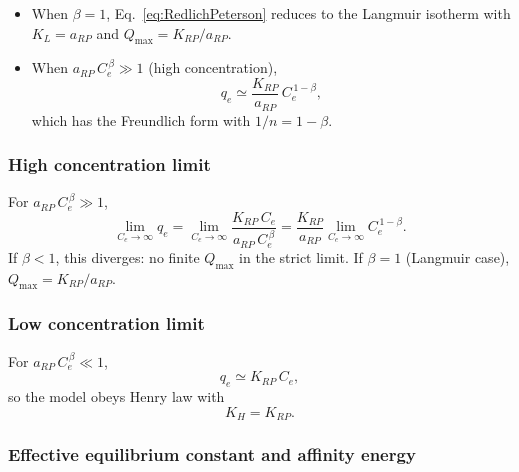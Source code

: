 \documentclass[12pt]{article}
\begin{document}
	\begin{itemize}
		\item When $\beta = 1$, Eq.~\eqref{eq:RedlichPeterson} reduces to
		the Langmuir isotherm with $K_L = a_{RP}$ and
		$Q_{\max} = K_{RP}/a_{RP}$.

		\item When $a_{RP}\,C_e^{\,\beta} \gg 1$ (high concentration),
		\[
		q_e \simeq \frac{K_{RP}}{a_{RP}}\, C_e^{\,1-\beta},
		\]
		which has the Freundlich form with $1/n = 1 - \beta$.
	\end{itemize}

	\subsubsection{High concentration limit}

	For $a_{RP}\,C_e^{\,\beta} \gg 1$,
	\begin{equation}
		\lim_{C_e \to \infty} q_e
		= \lim_{C_e \to \infty} \frac{K_{RP}\, C_e}{a_{RP}\, C_e^{\,\beta}}
		= \frac{K_{RP}}{a_{RP}} \lim_{C_e \to \infty} C_e^{\,1-\beta}.
	\end{equation}
	If $\beta < 1$, this diverges: no finite $Q_{\max}$ in the strict
	limit. If $\beta = 1$ (Langmuir case), $Q_{\max} = K_{RP}/a_{RP}$.

	\subsubsection{Low concentration limit}

	For $a_{RP}\,C_e^{\,\beta} \ll 1$,
	\begin{equation}
		q_e \simeq K_{RP}\, C_e,
	\end{equation}
	so the model obeys Henry law with
	\begin{equation}
		\boxed{K_H = K_{RP}.}
	\end{equation}

	\subsubsection{Effective equilibrium constant and affinity energy}
\end{document}
